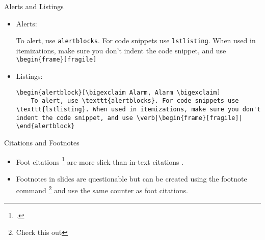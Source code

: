 \documentclass{beamer}
\begin{document}
\begin{frame}[fragile]{Alerts and Listings}
\begin{itemize}
	\item Alerts:
	\begin{alertblock}
		To alert, use \texttt{alertblocks}. For code snippets use \texttt{lstlisting}. When used in itemizations, make sure you don't indent the code snippet, and use \verb|\begin{frame}[fragile]|
	\end{alertblock}
\item Listings:
	\begin{lstlisting}
\begin{alertblock}[\bigexclaim Alarm, Alarm \bigexclaim]
	To alert, use \texttt{alertblocks}. For code snippets use \texttt{lstlisting}. When used in itemizations, make sure you don't indent the code snippet, and use \verb|\begin{frame}[fragile]|
\end{alertblock}
	\end{lstlisting}
\end{itemize}
\end{frame}

\begin{frame}{Citations and Footnotes}
\begin{itemize}
	\item Foot citations \footcite{AdamsFournier2003} are more slick than in-text citations \citep{AdamsFournier2003}.

	\item Footnotes in slides are questionable but can be created using the footnote command \footnote{Check this out} and use the same counter as foot citations.
\end{itemize}
\end{frame}
\end{document}
